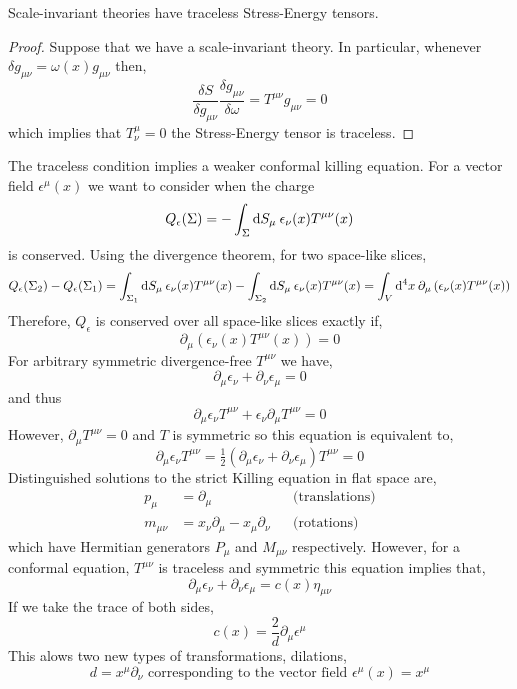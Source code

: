 \documentclass[12pt]{extarticle}
\begin{document}
\begin{theorem}
Scale-invariant theories have traceless Stress-Energy tensors.
\end{theorem} 
\begin{proof}
Suppose that we have a scale-invariant theory. In particular, whenever $\delta g_{\mu \nu} = \omega(x) g_{\mu \nu}$ then,
\[ \frac{\delta S}{\delta g_{\mu \nu}} \frac{\delta g_{\mu \nu}}{\delta \omega} = T^{\mu \nu} g_{\mu \nu} = 0 \]
which implies that $T^{\mu}_\nu = 0$ the Stress-Energy tensor is traceless.
\end{proof}
The traceless condition implies a weaker conformal killing equation. For a vector field $\epsilon^\mu(x)$ we want to consider when the charge 
\[ Q_{\epsilon}(\Sigma) = - \int_{\Sigma} \mathrm{d}S_\mu \: \epsilon_\nu(x) T^{\mu \nu}(x) \]
is conserved. Using the divergence theorem, for two space-like slices,
\[ Q_{\epsilon}(\Sigma_2) - Q_{\epsilon}(\Sigma_1) = \int_{\Sigma_1} \mathrm{d}S_\mu \: \epsilon_\nu(x) T^{\mu \nu}(x) - \int_{\Sigma_2} \mathrm{d}S_\mu \: \epsilon_\nu(x) T^{\mu \nu}(x) = \int_{V} \mathrm{d}^{4} x \: \partial_\mu \left(\epsilon_\nu(x) T^{\mu \nu} (x) \right) \]
Therefore, $Q_{\epsilon}$ is conserved over all space-like slices exactly if,
\[ \partial_\mu \left(\epsilon_\nu(x) T^{\mu \nu} (x) \right) = 0 \]
For arbitrary symmetric divergence-free $T^{\mu \nu}$ we have,
\[ \partial_\mu \epsilon_\nu + \partial_\nu \epsilon_\mu = 0 \]
and thus
\[ \partial_\mu \epsilon_\nu T^{\mu \nu} + \epsilon_\nu \partial_\mu T^{\mu \nu} = 0 \]
However, $\partial_\mu T^{\mu \nu} = 0$ and $T$ is symmetric so this equation is equivalent to,
\[ \partial_\mu \epsilon_\nu T^{\mu \nu} = \tfrac{1}{2} \left( \partial_\mu \epsilon_{\nu} + \partial_\nu \epsilon_{\mu} \right) T^{\mu \nu} = 0 \]
Distinguished solutions to the strict Killing equation in flat space are,
\begin{align*}
p_\mu & = \partial_\mu && \text{(translations)}
\\
m_{\mu\nu} & = x_\nu \partial_\mu - x_\mu \partial_\nu &&\text{(rotations)}
\end{align*}
which have Hermitian generators $P_\mu$ and $M_{\mu\nu}$ respectively. 
However, for a conformal equation, $T^{\mu \nu}$ is traceless and symmetric this equation implies that,
\[ \partial_\mu \epsilon_\nu + \partial_\nu \epsilon_\mu = c(x) \eta_{\mu \nu} \]
If we take the trace of both sides,
\[ c(x) = \frac{2}{d} \partial_\mu \epsilon^\mu \]
This alows two new types of transformations, dilations,
\[ d = x^\mu \partial_\nu \text{ corresponding to the vector field } \epsilon^\mu(x) = x^\mu \]
\end{document}
